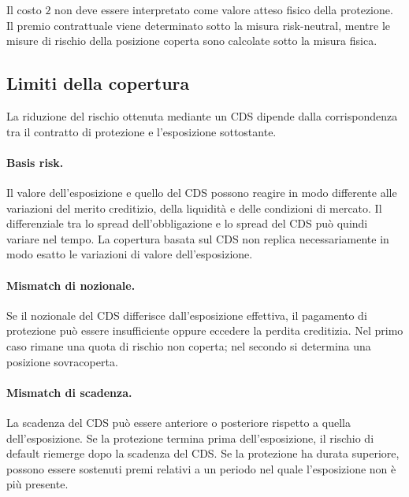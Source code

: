 Il costo $2$ non deve essere interpretato come valore atteso fisico
della protezione. Il premio contrattuale viene determinato sotto la
misura risk-neutral, mentre le misure di rischio della posizione
coperta sono calcolate sotto la misura fisica.

\subsection{Limiti della copertura}

\label{subsec:cap9-limiti-copertura-cds}

La riduzione del rischio ottenuta mediante un CDS dipende dalla
corrispondenza tra il contratto di protezione e l'esposizione
sottostante.

\paragraph{Basis risk.}

Il valore dell'esposizione e quello del CDS possono reagire in modo
differente alle variazioni del merito creditizio, della liquidit\`{a}
e delle condizioni di mercato. Il differenziale tra lo spread
dell'obbligazione e lo spread del CDS pu\`{o} quindi variare nel tempo.
La copertura basata sul CDS non replica necessariamente in modo esatto
le variazioni di valore dell'esposizione.

\paragraph{Mismatch di nozionale.}

Se il nozionale del CDS differisce dall'esposizione effettiva, il
pagamento di protezione pu\`{o} essere insufficiente oppure eccedere la
perdita creditizia. Nel primo caso rimane una quota di rischio non
coperta; nel secondo si determina una posizione sovracoperta.

\paragraph{Mismatch di scadenza.}

La scadenza del CDS pu\`{o} essere anteriore o posteriore rispetto a
quella dell'esposizione. Se la protezione termina prima
dell'esposizione, il rischio di default riemerge dopo la scadenza del
CDS. Se la protezione ha durata superiore, possono essere sostenuti
premi relativi a un periodo nel quale l'esposizione non \`{e} pi\`{u}
presente.

